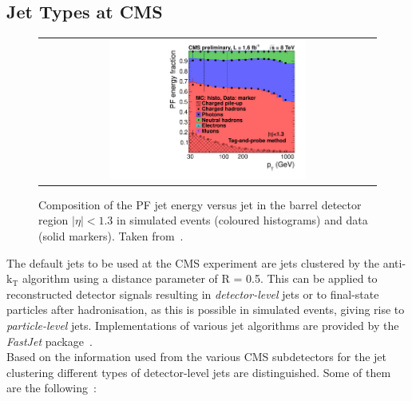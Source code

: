 \subsection{Jet Types at CMS}
\begin{figure}[!tp]
  \centering 
  \begin{tabular}{c}
    \includegraphics[width=0.6\textwidth]{figures/calcFrac_Frac0_MC-1.pdf} 
  \end{tabular}
  \caption{Composition of the PF jet energy versus jet \pt in the barrel detector region $|\eta| < 1.3$ in simulated events (coloured histograms) and data (solid markers). Taken from~\cite{CMS-DP-2012-012}.}
  \label{fig:jets_pf_comp}
\end{figure}
\label{subsec:jets_types}
The default jets to be used at the CMS experiment are jets clustered by the anti-$\mathrm{k_T}$ algorithm using a distance parameter of R = 0.5. This can be applied to reconstructed detector signals resulting in \textit{detector-level} jets or to final-state particles after hadronisation, as this is possible in simulated events, giving rise to \textit{particle-level} jets. Implementations of various jet algorithms are provided by the \textit{FastJet} package~\cite{Cacciari:2011ma, Cacciari:2005hq}. \\
Based on the information used from the various CMS subdetectors for the jet clustering different types of detector-level jets are distinguished. Some of them are the following~\cite{1748-0221-6-11-P11002}:
